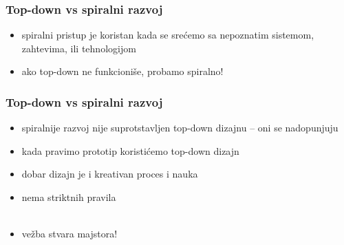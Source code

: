 \documentclass[utf8,compress,aspectratio=169]{beamer}
\begin{document}
\begin{frame}
  \frametitle{Top-down vs spiralni razvoj}
\begin{itemize}
  \item spiralni pristup je koristan kada se srećemo sa nepoznatim sistemom, zahtevima, ili tehnologijom
  \item ako top-down ne funkcioniše, probamo spiralno!
\end{itemize}
\end{frame}

\begin{frame}
  \frametitle{Top-down vs spiralni razvoj}
\begin{itemize}
  \item spiralnije razvoj nije suprotstavljen top-down dizajnu -- oni se nadopunjuju
  \item kada pravimo prototip koristićemo top-down dizajn
  \item dobar dizajn je i kreativan proces i nauka
  \item nema striktnih pravila \\ \ \\
  \item vežba stvara majstora!
\end{itemize}
\end{frame}
\end{document}
